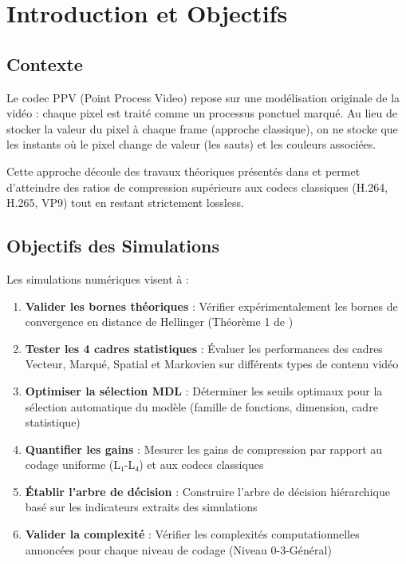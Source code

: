 \documentclass[12pt,a4paper]{article}
\begin{document}
	\tableofcontents
	\newpage
	
	\section{Introduction et Objectifs}
	\label{sec:introduction}
	
	\subsection{Contexte}
	\label{subsec:contexte}
	
	Le codec PPV (Point Process Video) repose sur une modélisation originale de la vidéo : chaque pixel est traité comme un processus ponctuel marqué. Au lieu de stocker la valeur du pixel à chaque frame (approche classique), on ne stocke que les instants où le pixel change de valeur (les sauts) et les couleurs associées.
	
	Cette approche découle des travaux théoriques présentés dans \cite{Uniform_temporal.tex, uniform_temp_coding.tex, versatile_pp.tex, versatile_main.tex} et permet d'atteindre des ratios de compression supérieurs aux codecs classiques (H.264, H.265, VP9) tout en restant strictement lossless.
	
	\subsection{Objectifs des Simulations}
	\label{subsec:objectifs}
	
	Les simulations numériques visent à :
	
	\begin{enumerate}
		\item \textbf{Valider les bornes théoriques} : Vérifier expérimentalement les bornes de convergence en distance de Hellinger (Théorème 1 de \cite{versatile_main.tex})
		\item \textbf{Tester les 4 cadres statistiques} : Évaluer les performances des cadres Vecteur, Marqué, Spatial et Markovien sur différents types de contenu vidéo
		\item \textbf{Optimiser la sélection MDL} : Déterminer les seuils optimaux pour la sélection automatique du modèle (famille de fonctions, dimension, cadre statistique)
		\item \textbf{Quantifier les gains} : Mesurer les gains de compression par rapport au codage uniforme (L₁-L₄) et aux codecs classiques
		\item \textbf{Établir l'arbre de décision} : Construire l'arbre de décision hiérarchique basé sur les indicateurs extraits des simulations
		\item \textbf{Valider la complexité} : Vérifier les complexités computationnelles annoncées pour chaque niveau de codage (Niveau 0-3-Général)
	\end{enumerate}
	
\end{document}
